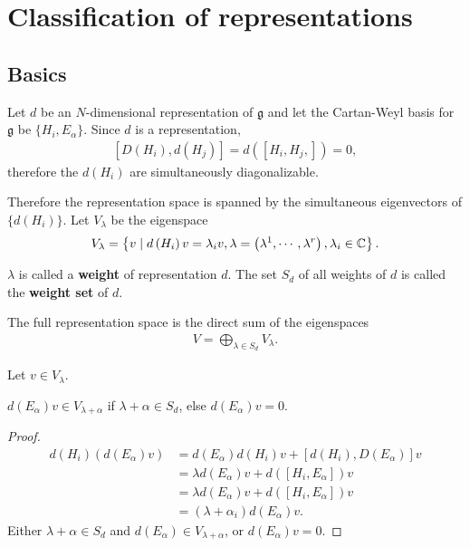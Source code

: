 
\section{Classification of representations}
\subsection{Basics}

Let $d$ be an $N$-dimensional representation of $\mathfrak{g}$ and let the Cartan-Weyl basis for $\mathfrak{g}$ be $\{H_i, E_\alpha\}$. Since $d$ is a representation,
\begin{align}
    \left[ D\left( H_i \right) , d\left( H_{j} \right)  \right] = d \left( \left[ H_i, H_j,  \right]  \right) = 0
,\end{align}
therefore the $d\left( H_i \right) $ are simultaneously diagonalizable.

Therefore the representation space is spanned by the simultaneous eigenvectors of $\{d \left( H_i \right) \} $. Let $V_\lambda$ be the eigenspace
\begin{align}
    V_{\lambda} = \left\{ v  \mid d \left( H_i \right) v = \lambda_i v, \lambda = \left( \lambda^{1} , \cdots, \lambda^{r} \right) , \lambda_i \in \mathbb{C} \right\} 
.\end{align}

\begin{definition}
    $\lambda$ is called a \textbf{weight} of representation $d$. The set $S_d$ of all weights of $d$ is called the \textbf{weight set} of $d$.
\end{definition}

The full representation space is the direct sum of the eigenspaces
\begin{align}
    V  = \bigoplus_{\lambda \in S_d} V_\lambda
.\end{align}

Let $v \in V_\lambda$.

\begin{claim}
    $d\left( E_\alpha \right)  v \in V_{\lambda + \alpha}$ if $\lambda + \alpha \in S_d$, else $d\left( E_\alpha \right) v = 0$.
\end{claim}

\begin{proof}
    \begin{align}
        d\left( H_i \right) \left( d\left( E_\alpha \right) v  \right) &= d\left( E_\alpha \right)  d\left( H_i \right) v + \left[ d\left( H_i \right) , D\left( E_\alpha \right)  \right]  v \\
        &= \lambda d \left( E_\alpha \right) v + d \left( \left[ H_i, E_\alpha \right]  \right) v  \\
        &= \lambda d\left( E_{\alpha}\right) v + d \left( \left[ H_i, E_\alpha \right]  \right) v \\
        &= \left( \lambda + \alpha_i \right) d\left( E_\alpha \right)  v 
    .\end{align}
    Either $\lambda + \alpha \in S_d$ and $d \left( E_\alpha \right) \in V_{\lambda + \alpha}$, or $d \left( E_\alpha \right) v = 0$.
\end{proof}

